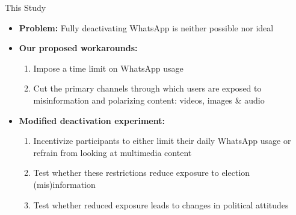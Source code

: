 \documentclass[usenames,dvipsnames,t]{beamer}
\begin{document}
\begin{frame}{This Study} \small  

\vspace*{\fill}

\begin{itemize}
\item \textbf{Problem:} Fully deactivating WhatsApp is neither possible nor ideal \pause

\item \textbf{Our proposed workarounds:}

\begin{enumerate}
\item Impose a time limit on WhatsApp usage  \vspace{.1cm} %
\item Cut the primary channels through which users are exposed to misinformation and polarizing content: videos, images \& audio \pause
\end{enumerate}

\item \textbf{Modified deactivation experiment:} 
\begin{enumerate}
\item Incentivize participants to either limit their daily WhatsApp usage or refrain from looking at multimedia content\vspace{.1cm} \pause
\item Test whether these restrictions reduce exposure to election (mis)information\vspace{.1cm} \pause
\item Test whether reduced exposure leads to changes in political attitudes 
\end{enumerate}

\end{itemize}

\vspace*{\fill}

\end{frame}
\end{document}
